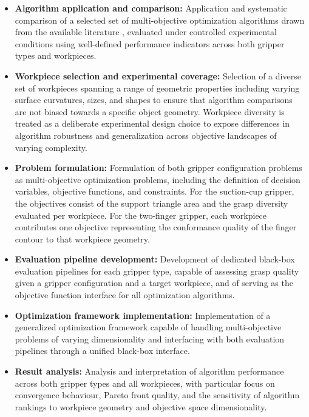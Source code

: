 \begin{itemize}
    \item \textbf{Algorithm application and comparison:} Application and systematic comparison of a selected set of multi-objective optimization
    algorithms drawn from the available literature \cite{pymoo}, evaluated under controlled experimental conditions using well-defined performance
    indicators across both gripper types and workpieces\cite{Audet2018Performance}.

    \item \textbf{Workpiece selection and experimental coverage:} Selection of a diverse set of workpieces spanning a range of geometric properties
    including varying surface curvatures, sizes, and shapes to ensure that algorithm comparisons are not biased towards a specific object geometry.
    Workpiece diversity is treated as a deliberate experimental design choice to expose differences in algorithm robustness and generalization across
    objective landscapes of varying complexity.

    \item \textbf{Problem formulation:} Formulation of both gripper configuration problems as multi-objective optimization problems, including the
    definition of decision variables, objective functions, and constraints. For the suction-cup gripper, the objectives consist of the support
    triangle area and the grasp diversity evaluated per workpiece. For the two-finger gripper, each workpiece contributes one objective representing
    the conformance quality of the finger contour to that workpiece geometry.

    \item \textbf{Evaluation pipeline development:} Development of dedicated black-box evaluation pipelines for each gripper type, capable of
    assessing grasp quality given a gripper configuration and a target workpiece, and of serving as the objective function interface for all
    optimization algorithms.

    \item \textbf{Optimization framework implementation:} Implementation of a generalized optimization framework capable of handling multi-objective
    problems of varying dimensionality and interfacing with both evaluation pipelines through a unified black-box interface.

    \item \textbf{Result analysis:} Analysis and interpretation of algorithm performance across both gripper types and all workpieces, with particular
    focus on convergence behaviour, Pareto front quality, and the sensitivity of algorithm rankings to workpiece geometry and objective space
    dimensionality.
\end{itemize}